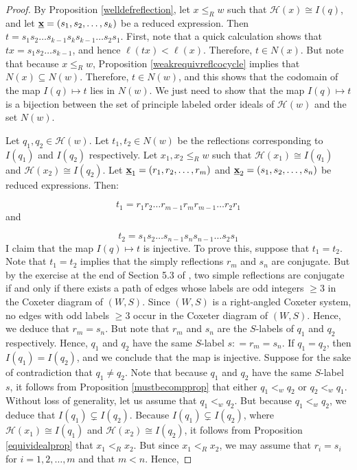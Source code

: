 \documentclass{amsart}
\theoremstyle{plain} %
\theoremstyle{definition}
\def\weakr{\leq_{R}}
\def\sweakr{<_{R}}
\def\H#1{\mathcal{H}(#1)}
\begin{document}
\begin{proof}
    By Proposition \ref{welldefreflection}, let $ x\weakr w$ such that $ \H{x} \cong I(q)$, and let $ \textbf{\underline{x}} = (s_{1},s_{2}, \dots , s_{k})$ be a reduced expression. Then $ t = s_{1}s_{2} \dots s_{k-1}s_{k}s_{k-1} \dots s_{2}s_{1}$. First, note that a quick calculation shows that $ tx = s_{1}s_{2} \dots s_{k-1}$, and hence $ \ell(tx) < \ell(x)$. Therefore, $ t\in N(x)$. But note that because $ x \weakr w$, Proposition \ref{weakrequivreflcocycle} implies that $ N(x) \subseteq N(w)$. Therefore, $ t\in N(w)$, and this shows that the codomain of the map $ I(q) \longmapsto t$ lies in $ N(w)$. We just need to show that the map $ I(q) \longmapsto t$ is a bijection between the set of principle labeled order ideals of $ \H{w}$ and the set $ N(w)$.

    Let $ q_{1},q_{2} \in \H{w}$. Let $ t_{1}, t_{2} \in N(w)$ be the reflections corresponding to $ I(q_{1})$ and $ I(q_{2})$ respectively. Let $ x_{1}, x_{2} \weakr w$ such that $ \H{x_{1}} \cong I(q_{1})$ and $ \H{x_{2}} \cong I(q_{2})$. Let $ \textbf{\underline{x}}_{1} = (r_{1},r_{2} , \dots , r_{m})$ and $ \textbf{\underline{x}}_{2} = (s_{1}, s_{2}, \dots , s_{n})$ be reduced expressions. Then:

    $$ t_{1} = r_{1}r_{2} \dots r_{m-1}r_{m}r_{m-1} \dots r_{2}r_{1}$$
    and

    $$ t_{2} = s_{1}s_{2} \dots s_{n-1}s_{n}s_{n-1} \dots s_{2}s_{1}$$
    I claim that the map $ I(q) \longmapsto t$ is injective. To prove this, suppose that $ t_{1} = t_{2}$. Note that $ t_{1} = t_{2}$ implies that the simply reflections $ r_{m}$ and $ s_{n}$ are conjugate. But by the exercise at the end of Section 5.3 of \cite{humphreys1992reflection}, two simple reflections are conjugate if and only if there exists a path of edges whose labels are odd integers $ \geq 3$ in the Coxeter diagram of $(W,S)$. Since $ (W,S)$ is a right-angled Coxeter system, no edges with odd labels $\geq 3$ occur in the Coxeter diagram of $(W,S)$. Hence, we deduce that $ r_{m} = s_{n}$. But note that $ r_{m}$ and $ s_{n}$ are the $S$-labels of $ q_{1}$ and $q_{2}$ respectively. Hence, $ q_{1}$ and $ q_{2}$ have the same $S$-label $ s: = r_{m} = s_{n}$. If $ q_{1} = q_{2}$, then $ I(q_{1}) = I(q_{2})$, and we conclude that the map is injective. Suppose for the sake of contradiction that $ q_{1} \neq q_{2}$. Note that because $ q_{1}$ and $ q_{2}$ have the same $S$-label $s$, it follows from Proposition \ref{mustbecompprop} that either $ q_{1} <_{w} q_{2}$ or $ q_{2} <_{w} q_{1}$. Without loss of generality, let us assume that $ q_{1} <_{w} q_{2}$. But because $ q_{1} <_{w} q_{2}$, we deduce that $ I(q_{1}) \subsetneq I(q_{2})$. Because $I(q_{1}) \subsetneq I(q_{2}) $, where $ \H{x_{1}} \cong I(q_{1})$ and $ \H{x_{2}} \cong I(q_{2})$, it follows from Proposition \ref{equividealprop} that $ x_{1} \sweakr x_{2}$. But since $ x_{1} \sweakr x_{2}$, we may assume that $ r_{i} = s_{i}$ for $ i=1,2, \dots, m$ and that $ m< n$. Hence, 


\end{proof}
\end{document}
